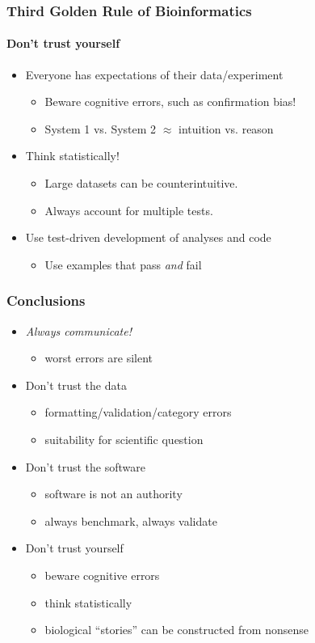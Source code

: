 \documentclass[table]{beamer}
\begin{document}
  \begin{frame}
    \frametitle{Third Golden Rule of Bioinformatics}
    \framesubtitle{Don't trust yourself}
	\begin{itemize}
	  \item Everyone has expectations of their data/experiment
	    \begin{itemize}
	      \item Beware cognitive errors, such as confirmation bias!
	      \item System 1 vs. System 2 $\approx$ intuition vs. reason
	    \end{itemize}
	  \item Think statistically! 
	    \begin{itemize}
	      \item Large datasets can be counterintuitive.
	      \item Always account for multiple tests.
	    \end{itemize}
	  \item Use test-driven development of analyses and code
	    \begin{itemize}
	      \item Use examples that pass \textit{and} fail
	    \end{itemize}	  
	\end{itemize}
  \end{frame}

  \begin{frame}
    \frametitle{Conclusions}
	\begin{itemize}
	  \item \emph{Always communicate!}
	    \begin{itemize}
	      \item worst errors are silent
	    \end{itemize}	  
	  \item Don't trust the data
	    \begin{itemize}
	      \item formatting/validation/category errors
	      \item suitability for scientific question
	    \end{itemize}
	  \item Don't trust the software
	    \begin{itemize}
	      \item software is not an authority
	      \item always benchmark, always validate
	    \end{itemize}
	  \item Don't trust yourself
	    \begin{itemize}
	      \item beware cognitive errors
	      \item think statistically
	      \item biological ``stories'' can be constructed from nonsense
	    \end{itemize}	  
	\end{itemize}
  \end{frame}
\end{document}
